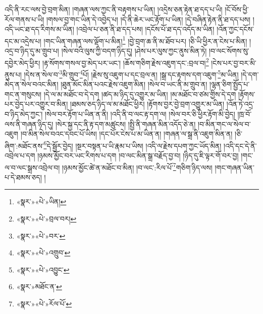 འདི་ནི་རང་ལས་བྱེ་བྲག་མིན། །གཞན་ལས་ཀྱང་ནི་བརྟགས་པ་ཡིན། །འདྲེས་ཅན་རྟེན་ཐ་དད་པ་ཡི། །ངོ་བོས་ཕྱི་རོལ་གནས་པ་ཡི། །གསལ་བྱ་གང་ཡིན་དེ་འབྱེད་པ། །དེ་ནི་ཆེར་ཡང་རྟོག་པ་ཡིན། །དེ་བཞིན་རྟེན་ནི་ཐ་དད་པས། །འདི་ཡང་ཐ་དད་རིགས་མ་ཡིན། །འབྲེལ་པ་ཅན་ནི་ཐ་དད་པས། །དངོས་པོ་ཐ་དད་འདོད་མ་ཡིན། །འོན་ཀྱང་དངོས་དང་མ་འདྲེས་པ། །གང་ཡིན་གཞན་ལས་ལྡོག་པ་མིན།\footnote{«སྣར་»«པེ་»ཡིན།} །བྱེ་བྲག་ཆ་ནི་མ་ཐོབ་པར། །ཅི་ཡི་ཕྱིར་ན་ངེས་པ་མིན། །འདྲ་བ་ཉིད་དུ་མ་གྲུབ་པ། །སེལ་བའི་ལུས་ཀྱི་བདག་ཉིད་དུ། །ཤེས་པར་ལུས་ཀྱང་ནུས་མིན་ཏེ། །བ་ལང་སོགས་སུ་དབྱེར་མེད་ཕྱིར། །རྟ་སོགས་གསལ་བྱ་མེད་པར་ཡང་། །ཆོས་གཅིག་རྗེས་འཇུག་དང་:བྲལ་བ།\footnote{«སྣར་»«པེ་»བྲལ་བར།} །ངེས་པར་བྱ་བར་མི་ནུས་པ། །དེས་ན་སེལ་བ་\footnote{«སྣར་»«པེ་»བར་}མི་གྲུབ་\footnote{«སྣར་»«པེ་»འགྲུབ་}པོ། །རྗེས་སུ་འཇུག་པ་དང་བྲལ་ན། །སྒྲ་དང་རྟགས་དག་འཇུག་\footnote{«སྣར་»«པེ་»འབྱུང་}མ་ཡིན། །དེ་དག་མེད་ན་སེལ་བའང་མིན། །ཐུན་མོང་མིན་པའང་རྗེས་འཇུག་མིན། །སེལ་བ་ཡང་ནི་མ་གྲུབ་ན། །ལྷན་ཅིག་སྤྱོད་པ་གང་ན་གསུངས། །དེ་ལ་མ་མཐོང་བ་དེ་དག །ཚད་མ་ཉིད་དུ་འགྱུར་མ་ཡིན། །མ་མཐོང་བ་ཙམ་གྱིས་དེ་དག །རྟོགས་པར་བྱེད་པར་འགྱུར་བ་མིན། །ཐམས་ཅད་ཉིད་ལ་མ་མཐོང་ཕྱིར། །རྟོགས་བྱར་བྱེ་བྲག་འགྱུར་མ་ཡིན། །འོན་ཏེ་འདྲ་བ་ཉིད་མེད་ཀྱང་། །སེལ་བར་རྟོག་པ་ཡིན་ན་ནི། །འདི་ནི་བ་ལང་རྟ་དག་ལ། །སེལ་བར་ཅི་ཕྱིར་རྟོག་མི་བྱེད། །ཁྲ་བོ་ལས་ནི་གཞན་ཉིད་དུ། །སེར་སྐྱ་དང་ནི་རྟ་དག་མཚུངས། །སྤྱི་ནི་གཞན་མིན་འདོད་ཅེ་ན། །བ་མིན་གང་ལ་སེལ་བ་འཇུག །བ་མིན་སེལ་བའང་དབང་པོ་ཡིས། །དང་པོར་ངེས་པ་མ་ཡིན་ན། །གཞན་ལ་སྒྲ་ནི་འཇུག་མིན་ན། །ཅི་ཞིག་:མཐོང་ནས་\footnote{«སྣར་»མཐོང་ན་}དེ་སྦྱོར་བྱེད། །སྔར་བསྟན་པ་ཡི་རྣམ་པ་ཡིས། །འདི་ལ་རྗེས་དཔག་ཀྱང་ཡོད་མིན། །འདི་དང་དེ་ནི་འབྲེལ་པ་དག །ཉམས་མྱོང་བར་ཡང་རིགས་པ་དག །བ་ལང་མིན་སྒྲ་བརྗོད་བྱ་བ། །ཉིད་དུ་ཇི་ལྟར་གོ་བར་བྱ། །གང་ལ་བ་ལང་སྒྲས་འབྲེལ་བ། །ཉམས་མྱོང་ཚེ་ན་མཐོང་བ་མིན། །བ་ལང་:རིལ་པོ་\footnote{«སྣར་»«པེ་»རོལ་པོ་}གཅིག་ཉིད་ལས། །གང་གཞན་ཡིན་པ་དེ་ཐམས་ཅད། །
